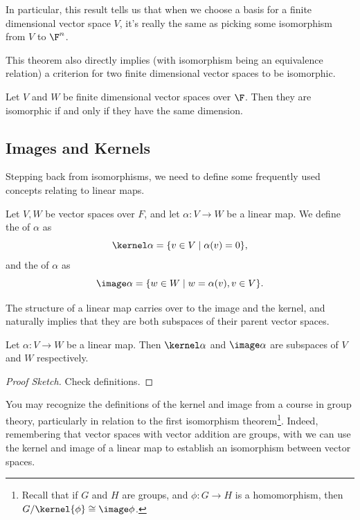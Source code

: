 \documentclass[a4paper]{scrartcl}
\begin{document}
In particular, this result tells us that when we choose a basis for a finite dimensional vector space $V$, it's really the same as picking some isomorphism from $V$ to $\F^n$. 

This theorem also directly implies (with isomorphism being an equivalence relation) a criterion for two finite dimensional vector spaces to be isomorphic.

\begin{theorem}
    Let $V$ and $W$ be finite dimensional vector spaces over $\F$. Then they are isomorphic if and only if they have the same dimension.
\end{theorem}

\subsection{Images and Kernels}

Stepping back from isomorphisms, we need to define some frequently used concepts relating to linear maps.

\begin{definition}
    Let $V, W$ be vector spaces over $F$, and let $\alpha: V \rightarrow W$ be a linear map. We define the  of $\alpha$ as
    $$
    \kernel \alpha = \{ v\in V \mid \alpha(v) = 0\},
    $$
    and the  of $\alpha$ as
    $$
    \image \alpha = \{ w \in W \mid w = \alpha(v), v \in V\}.
    $$
\end{definition}

The structure of a linear map carries over to the image and the kernel, and naturally implies that they are both subspaces of their parent vector spaces.

\begin{lemma}
    Let $\alpha: V \rightarrow W$ be a linear map. Then $\kernel \alpha$ and $\image \alpha$ are subspaces of $V$ and $W$ respectively.
\end{lemma}
\begin{proof}[Proof Sketch]
    Check definitions.
\end{proof}

You may recognize the definitions of the kernel and image from a course in group theory, particularly in relation to the first isomorphism theorem\footnote{Recall that if $G$ and $H$ are groups, and $\phi: G \rightarrow H$ is a homomorphism, then $G/\kernel{\phi} \cong \image \phi$.}. Indeed, remembering that vector spaces with vector addition are groups, with we can use the kernel and image of a linear map to establish an isomorphism between vector spaces.
\end{document}
